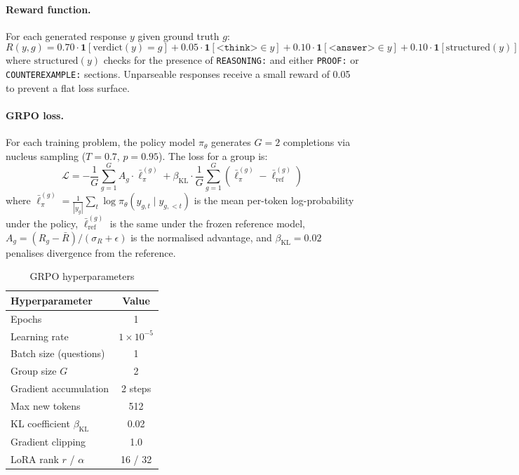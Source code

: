 \documentclass{article}
\begin{document}
\paragraph{Reward function.} For each generated response $y$ given ground truth $g$:
\begin{equation}
R(y, g) = 0.70 \cdot \mathbf{1}[\text{verdict}(y) = g] + 0.05 \cdot \mathbf{1}[\texttt{<think>} \in y] + 0.10 \cdot \mathbf{1}[\texttt{<answer>} \in y] + 0.10 \cdot \mathbf{1}[\text{structured}(y)]
\label{eq:reward}
\end{equation}
where $\text{structured}(y)$ checks for the presence of \texttt{REASONING:} and either \texttt{PROOF:} or \texttt{COUNTEREXAMPLE:} sections. Unparseable responses receive a small reward of 0.05 to prevent a flat loss surface.

\paragraph{GRPO loss.} For each training problem, the policy model $\pi_\theta$ generates $G{=}2$ completions via nucleus sampling ($T{=}0.7$, $p{=}0.95$). The loss for a group is:
\begin{equation}
\mathcal{L} = -\frac{1}{G}\sum_{g=1}^{G} A_g \cdot \bar{\ell}_{\pi}^{(g)} + \beta_{\text{KL}} \cdot \frac{1}{G}\sum_{g=1}^{G}\left(\bar{\ell}_{\pi}^{(g)} - \bar{\ell}_{\text{ref}}^{(g)}\right)
\label{eq:grpo}
\end{equation}
where $\bar{\ell}_{\pi}^{(g)} = \frac{1}{|y_g|}\sum_{t} \log \pi_\theta(y_{g,t} \mid y_{g,<t})$ is the mean per-token log-probability under the policy, $\bar{\ell}_{\text{ref}}^{(g)}$ is the same under the frozen reference model, $A_g = (R_g - \bar{R}) / (\sigma_R + \epsilon)$ is the normalised advantage, and $\beta_{\text{KL}}{=}0.02$ penalises divergence from the reference.

\begin{table}[h]
  \caption{GRPO hyperparameters}
  \label{tab:grpo}
  \centering
  \begin{tabular}{lc}
    \toprule
    Hyperparameter & Value \\
    \midrule
    Epochs & 1 \\
    Learning rate & $1 \times 10^{-5}$ \\
    Batch size (questions) & 1 \\
    Group size $G$ & 2 \\
    Gradient accumulation & 2 steps \\
    Max new tokens & 512 \\
    KL coefficient $\beta_{\text{KL}}$ & 0.02 \\
    Gradient clipping & 1.0 \\
    LoRA rank $r$ / $\alpha$ & 16 / 32 \\
    \bottomrule
  \end{tabular}
\end{table}
\end{document}
